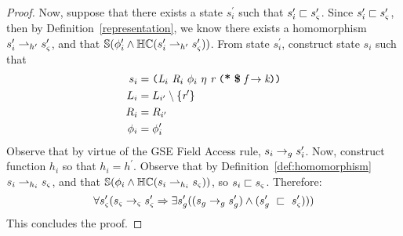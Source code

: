\begin{proof}
Now, suppose that there exists a state $s_i^\prime$ such that $s_i^\prime \sqsubset s_{\varsigma}^\prime$. Since $s_i^\prime \sqsubset s_{\varsigma}^\prime$, then by Definition~\ref{representation}, we know there exists a homomorphism $s_i^\prime \rightharpoonup_{h^\prime} s_{\varsigma}^\prime$, and that $\mathbb{S}( \phi_i^\prime \wedge \mathbb{HC}(s_i^\prime \rightharpoonup_{h^\prime} s_{\varsigma}^\prime) )$. From state $s_i^\prime$, construct state $s_i$ such that 
\begin{align*}
s_i &= \lp \cfgnt{L}_{i}\ \cfgnt{R}_{i}\ \phi_i\ \eta\ \cfgnt{r}\ \lp \cfgt{*}\ \cfgt{\$}\ \cfgnt{f} \rightarrow \cfgnt{k}\rp \rp\\
L_i &= L_{i^\prime} \setminus \{\cfgnt{r}^\prime \}\\
R_i &= R_{i^\prime}\\
\phi_i &= \phi_i^\prime
\end{align*}
Observe that by virtue of the GSE Field Access rule, $s_i \rightarrow_{g} s_i^\prime$. Now, construct function $h_i$ so that $h_i = h^\prime$. Observe that by Definition~\ref{def:homomorphism} $s_i \rightharpoonup_{h_i} s_{\varsigma}$,  and that $\mathbb{S}( \phi_i \wedge \mathbb{HC}(s_i \rightharpoonup_{h_i} s_{\varsigma}) )$, so $s_i \sqsubset s_{\varsigma}$. Therefore:
\begin{equation}
\forall s_{\varsigma}^\prime ( s_{\varsigma} \rightarrow_{\varsigma} s_{\varsigma}^\prime\Rightarrow \exists s_{g}^\prime( (s_{g} \rightarrow_{g} s_{g}^\prime )\wedge (s_{g}^\prime\ \sqsubset\ s_{\varsigma}^\prime ))  )
\end{equation}
 This concludes the proof.

%

\end{proof}

